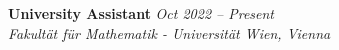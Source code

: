 \newcommand{\positionentry}[3]{%
  \textbf{#1} \hfill \textit{#3} \\
  \textit{#2} \\
  \vspace{2mm}
}

\positionentry
  {University Assistant}
  {Fakultät für Mathematik - Universität Wien, Vienna}
  {Oct 2022 – Present}
